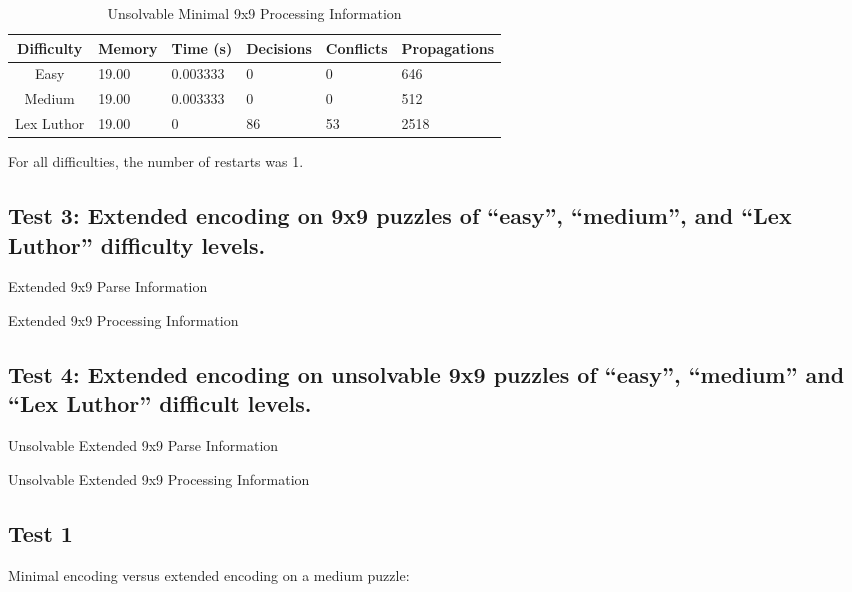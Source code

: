 \documentclass[conference,draftclsnofoot]{IEEEtran}
\begin{document}
\begin{table}[!h]
	\centering
	\begin{tabular}{c | l l p{20pt} p{20pt}  l }
		Difficulty & Memory & Time (s) & Decisions &
		Conflicts & Propagations \\\hline
		Easy 		& 19.00 & 0.003333 & 0  & 0  & 646 \\
		Medium 		& 19.00 & 0.003333 & 0  & 0  & 512 \\
		Lex Luthor 	& 19.00 & 0 	   & 86 & 53 & 2518
	\end{tabular}
	\caption{Unsolvable Minimal 9x9 Processing Information}

	\label{tab:summary}
	For all difficulties, the number of restarts was 1.

\end{table}

\subsection{Test 3: Extended encoding on 9x9 puzzles of ``easy'', ``medium'',
and ``Lex Luthor'' difficulty levels.}
\begin{table}[htbp]
	\centering
	\caption{Extended 9x9 Parse Information}
	\label{tab:summary}
\end{table}

\begin{table}[htbp]
	\centering
	\caption{Extended 9x9 Processing Information}
\end{table}

\subsection{Test 4: Extended encoding on unsolvable 9x9 puzzles of ``easy'',
``medium'' and ``Lex Luthor'' difficult levels.}

\begin{table}[!h]
	\centering
	\caption{Unsolvable Extended 9x9 Parse Information}
\end{table}

\begin{table}[!h]
	\centering
	\caption{Unsolvable Extended 9x9 Processing Information}
\end{table}



\subsection{Test 1}
Minimal encoding versus extended encoding on a medium puzzle:
\end{document}
